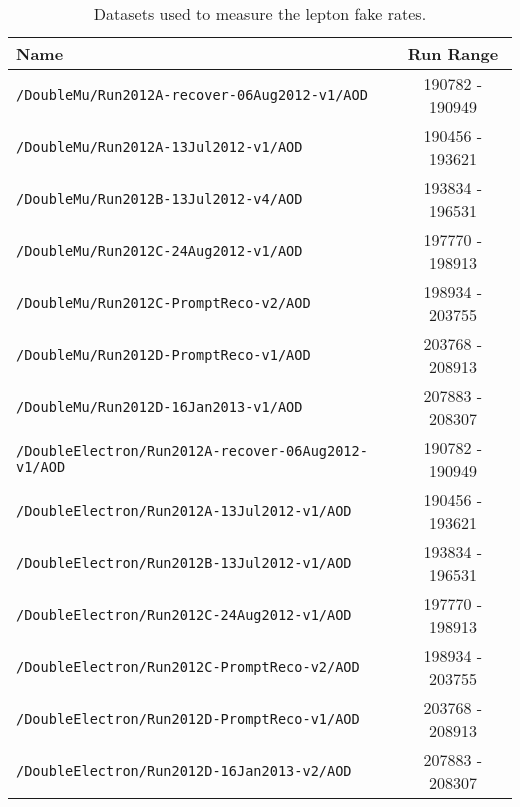 \begin{table}[hbt]
\caption{\label{tab:App:FRDsets}Datasets used to measure the lepton fake rates.}
\begin{center}
\begin{tabular}{lc}\hline\hline
Name		& Run Range \\ \hline
\verb=/DoubleMu/Run2012A-recover-06Aug2012-v1/AOD=                 &   190782 - 190949\\ 
\verb=/DoubleMu/Run2012A-13Jul2012-v1/AOD=                                  &  190456 - 193621                     \\ 
\verb=/DoubleMu/Run2012B-13Jul2012-v4/AOD=                                  &  193834 - 196531                     \\ 
\verb=/DoubleMu/Run2012C-24Aug2012-v1/AOD=                                &  197770 - 198913 \\  
\verb=/DoubleMu/Run2012C-PromptReco-v2/AOD=                               &  198934 - 203755                     \\ 
\verb=/DoubleMu/Run2012D-PromptReco-v1/AOD=                               &  203768 - 208913  \\
\verb=/DoubleMu/Run2012D-16Jan2013-v1/AOD=                                 &  207883 - 208307  \\

\verb=/DoubleElectron/Run2012A-recover-06Aug2012-v1/AOD=         &   190782 - 190949                    \\ 
\verb=/DoubleElectron/Run2012A-13Jul2012-v1/AOD=                         & 190456 - 193621                      \\ 
\verb=/DoubleElectron/Run2012B-13Jul2012-v1/AOD=                         &  193834 - 196531 \\ 
\verb=/DoubleElectron/Run2012C-24Aug2012-v1/AOD=                       &   197770 - 198913                    \\ 
\verb=/DoubleElectron/Run2012C-PromptReco-v2/AOD=                     &    198934 - 203755                  \\ 
\verb=/DoubleElectron/Run2012D-PromptReco-v1/AOD=                      &  203768 - 208913  \\
\verb=/DoubleElectron/Run2012D-16Jan2013-v2/AOD=                        &   207883 - 208307 \\


\end{tabular}
\end{center}
\end{table}
